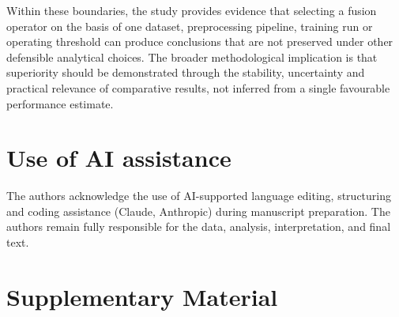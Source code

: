 \documentclass[11pt,a4paper]{article}
\begin{document}
Within these boundaries, the study provides evidence that selecting a fusion operator on
the basis of one dataset, preprocessing pipeline, training run or operating threshold can
produce conclusions that are not preserved under other defensible analytical choices. The
broader methodological implication is that superiority should be demonstrated through
the stability, uncertainty and practical relevance of comparative results, not inferred
from a single favourable performance estimate.

\section{Use of AI assistance}\label{use-of-ai-assistance}

The authors acknowledge the use of AI-supported language editing, structuring and
coding assistance (Claude, Anthropic) during manuscript preparation. The authors remain
fully responsible for the data, analysis, interpretation, and final text.




\clearpage
\section*{Supplementary Material}
\setcounter{table}{0}
\renewcommand{\thetable}{S\arabic{table}}
\renewcommand{\theHtable}{S\arabic{table}}
\setcounter{figure}{0}
\renewcommand{\thefigure}{S\arabic{figure}}
\renewcommand{\theHfigure}{S\arabic{figure}}

\begingroup\footnotesize\setlength{\tabcolsep}{3pt}
\end{document}
